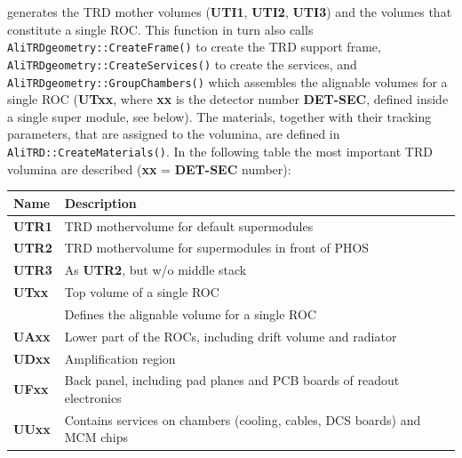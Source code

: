 \documentclass{alicetdr}
\begin{document}
generates the TRD mother volumes ({\bf UTI1}, {\bf UTI2}, {\bf UTI3}) and the
volumes that constitute a single ROC.  This function in turn also calls
{\tt AliTRDgeometry::CreateFrame()} to create the TRD support frame,
{\tt AliTRDgeometry::CreateServices()} to create the services, and
{\tt AliTRDgeometry::GroupChambers()} which assembles the alignable
volumes for a single ROC ({\bf UTxx}, where {\bf xx} is the detector
number {\bf DET-SEC}, defined inside a single super module, see below). The
materials, together with their tracking parameters, that are assigned to
the volumina, are defined in {\tt AliTRD::CreateMaterials()}.
In the following table the most important TRD volumina are described
({\bf xx} = {\bf DET-SEC} number):
%
\begin{center}
\begin{tabular}{l|l}
Name       & Description                                                                \\ \hline
{\bf UTR1} & TRD mothervolume for default supermodules                                  \\
{\bf UTR2} & TRD mothervolume for supermodules in front of PHOS                         \\
{\bf UTR3} & As {\bf UTR2}, but w/o middle stack                                        \\ \hline
{\bf UTxx} & Top volume of a single ROC                                                 \\
           & Defines the alignable volume for a single ROC                              \\ \hline
{\bf UAxx} & Lower part of the ROCs, including drift volume and radiator                \\
{\bf UDxx} & Amplification region                                                       \\
{\bf UFxx} & Back panel, including pad planes and PCB boards of readout electronics     \\
{\bf UUxx} & Contains services on chambers (cooling, cables, DCS boards) and MCM chips  \\
\end{tabular}
\end{center}
%
\end{document}
